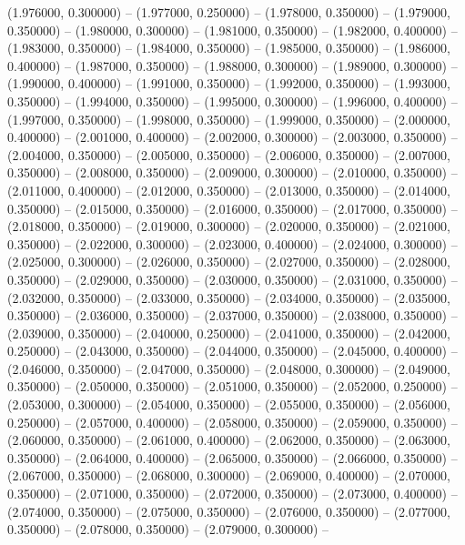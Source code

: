 (1.976000, 0.300000) -- 
(1.977000, 0.250000) -- 
(1.978000, 0.350000) -- 
(1.979000, 0.350000) -- 
(1.980000, 0.300000) -- 
(1.981000, 0.350000) -- 
(1.982000, 0.400000) -- 
(1.983000, 0.350000) -- 
(1.984000, 0.350000) -- 
(1.985000, 0.350000) -- 
(1.986000, 0.400000) -- 
(1.987000, 0.350000) -- 
(1.988000, 0.300000) -- 
(1.989000, 0.300000) -- 
(1.990000, 0.400000) -- 
(1.991000, 0.350000) -- 
(1.992000, 0.350000) -- 
(1.993000, 0.350000) -- 
(1.994000, 0.350000) -- 
(1.995000, 0.300000) -- 
(1.996000, 0.400000) -- 
(1.997000, 0.350000) -- 
(1.998000, 0.350000) -- 
(1.999000, 0.350000) -- 
(2.000000, 0.400000) -- 
(2.001000, 0.400000) -- 
(2.002000, 0.300000) -- 
(2.003000, 0.350000) -- 
(2.004000, 0.350000) -- 
(2.005000, 0.350000) -- 
(2.006000, 0.350000) -- 
(2.007000, 0.350000) -- 
(2.008000, 0.350000) -- 
(2.009000, 0.300000) -- 
(2.010000, 0.350000) -- 
(2.011000, 0.400000) -- 
(2.012000, 0.350000) -- 
(2.013000, 0.350000) -- 
(2.014000, 0.350000) -- 
(2.015000, 0.350000) -- 
(2.016000, 0.350000) -- 
(2.017000, 0.350000) -- 
(2.018000, 0.350000) -- 
(2.019000, 0.300000) -- 
(2.020000, 0.350000) -- 
(2.021000, 0.350000) -- 
(2.022000, 0.300000) -- 
(2.023000, 0.400000) -- 
(2.024000, 0.300000) -- 
(2.025000, 0.300000) -- 
(2.026000, 0.350000) -- 
(2.027000, 0.350000) -- 
(2.028000, 0.350000) -- 
(2.029000, 0.350000) -- 
(2.030000, 0.350000) -- 
(2.031000, 0.350000) -- 
(2.032000, 0.350000) -- 
(2.033000, 0.350000) -- 
(2.034000, 0.350000) -- 
(2.035000, 0.350000) -- 
(2.036000, 0.350000) -- 
(2.037000, 0.350000) -- 
(2.038000, 0.350000) -- 
(2.039000, 0.350000) -- 
(2.040000, 0.250000) -- 
(2.041000, 0.350000) -- 
(2.042000, 0.250000) -- 
(2.043000, 0.350000) -- 
(2.044000, 0.350000) -- 
(2.045000, 0.400000) -- 
(2.046000, 0.350000) -- 
(2.047000, 0.350000) -- 
(2.048000, 0.300000) -- 
(2.049000, 0.350000) -- 
(2.050000, 0.350000) -- 
(2.051000, 0.350000) -- 
(2.052000, 0.250000) -- 
(2.053000, 0.300000) -- 
(2.054000, 0.350000) -- 
(2.055000, 0.350000) -- 
(2.056000, 0.250000) -- 
(2.057000, 0.400000) -- 
(2.058000, 0.350000) -- 
(2.059000, 0.350000) -- 
(2.060000, 0.350000) -- 
(2.061000, 0.400000) -- 
(2.062000, 0.350000) -- 
(2.063000, 0.350000) -- 
(2.064000, 0.400000) -- 
(2.065000, 0.350000) -- 
(2.066000, 0.350000) -- 
(2.067000, 0.350000) -- 
(2.068000, 0.300000) -- 
(2.069000, 0.400000) -- 
(2.070000, 0.350000) -- 
(2.071000, 0.350000) -- 
(2.072000, 0.350000) -- 
(2.073000, 0.400000) -- 
(2.074000, 0.350000) -- 
(2.075000, 0.350000) -- 
(2.076000, 0.350000) -- 
(2.077000, 0.350000) -- 
(2.078000, 0.350000) -- 
(2.079000, 0.300000) -- 
